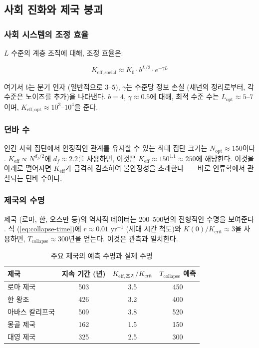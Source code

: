 \documentclass[12pt,a4paper]{article}
\newcommand{\Keff}{K_{\mathrm{eff}}}
\newcommand{\Keffcrit}{K_{\mathrm{crit}}}
\newcommand{\df}{d_{\!f}}
\theoremstyle{remark}
\begin{document}
	\subsection{사회 진화와 제국 붕괴}
	\label{subsec:social}
	
	\subsubsection{사회 시스템의 조정 효율}
	
	\(L\) 수준의 계층 조직에 대해, 조정 효율은:
	
	\begin{equation}
		K_{\mathrm{eff},\text{social}} \approx K_0 \cdot b^{L/2} \cdot e^{-\gamma L}
		\label{eq:social-keff}
	\end{equation}
	
	여기서 \(b\)는 분기 인자 (일반적으로 \(3\)--\(5\)), \(\gamma\)는 수준당 정보 손실 (섀넌의 정리로부터, 각 수준은 노이즈를 추가)을 나타낸다. \(b=4\), \(\gamma \approx 0.5\)에 대해, 최적 수준 수는 \(L_{\text{opt}} \approx 5\)--\(7\)이며, \(K_{\mathrm{eff},\text{opt}} \approx 10^3\)--\(10^4\)을 준다.
	
	\subsubsection{던바 수}
	
	인간 사회 집단에서 안정적인 관계를 유지할 수 있는 최대 집단 크기는 \(N_{\text{opt}} \approx 150\)이다 \cite{Dunbar1992}. \(\Keff \propto N^{\df/2}\)에 \(\df \approx 2.2\)를 사용하면, 이것은 \(\Keff \approx 150^{1.1} \approx 250\)에 해당한다. 이것을 아래로 떨어지면 \(\Keff\)가 급격히 감소하여 불안정성을 초래한다——바로 인류학에서 관찰되는 던바 수이다.
	
	\subsubsection{제국의 수명}
	
	제국 (로마, 한, 오스만 등)의 역사적 데이터는 200--500년의 전형적인 수명을 보여준다 \cite{TurchinNefedov2009}. 식 (\ref{eq:collapse-time})에 \(r \approx 0.01\) yr$^{-1}$ (세대 시간 척도)와 \(K(0)/\Keffcrit \approx 3\)을 사용하면, \(T_{\text{collapse}} \approx 300\)년을 얻는다. 이것은 관측과 일치한다.
	
	\begin{table}[htbp]
		\centering
		\caption{주요 제국의 예측 수명과 실제 수명 \cite{TurchinNefedov2009}}
		\label{tab:empires}
		\small
		\begin{tabular}{lccc}
			\toprule
			\textbf{제국} & \textbf{지속 기간 (년)} & $K_{\mathrm{eff},\text{초기}}/\Keffcrit$ & $T_{\text{collapse}}$ 예측 \\
			\midrule
			로마 제국 & 503 & 3.5 & 450 \\
			한 왕조 & 426 & 3.2 & 400 \\
			아바스 칼리프국 & 509 & 3.8 & 520 \\
			몽골 제국 & 162 & 1.5 & 150 \\
			대영 제국 & 325 & 2.5 & 300 \\
			\bottomrule
		\end{tabular}
	\end{table}
	
\end{document}

